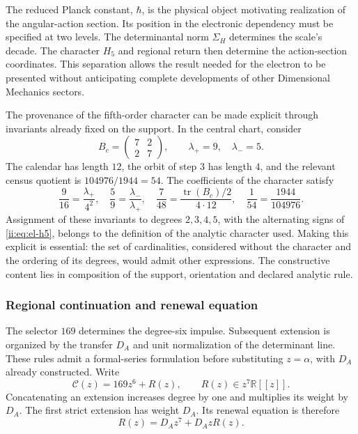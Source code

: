 The reduced Planck constant, \(\hbar\), is the physical object motivating realization of the angular-action section. Its position in the electronic dependency must be specified at two levels. The determinantal norm \(\Sigma_H\) determines the scale's decade. The character \(H_5\) and regional return then determine the action-section coordinates. This separation allows the result needed for the electron to be presented without anticipating complete developments of other Dimensional Mechanics sectors.

The provenance of the fifth-order character can be made explicit through invariants already fixed on the support. In the central chart, consider
\[
 B_c=\begin{pmatrix}7&2\\2&7\end{pmatrix},
 \qquad \lambda_+=9,\quad\lambda_-=5.
\]
The calendar has length \(12\), the orbit of step \(3\) has length \(4\), and the relevant census quotient is \(104976/1944=54\). The coefficients of the character satisfy
\begin{equation}
 \frac9{16}=\frac{\lambda_+}{4^2},\quad
 \frac59=\frac{\lambda_-}{\lambda_+},\quad
 \frac7{48}=\frac{\operatorname{tr}(B_c)/2}{4\cdot12},\quad
 \frac1{54}=\frac{1944}{104976}.
 \label{ii:eq:revision-h5-coeficientes}
\end{equation}
Assignment of these invariants to degrees \(2,3,4,5\), with the alternating signs of \eqref{ii:eq:el-h5}, belongs to the definition of the analytic character used. Making this explicit is essential: the set of cardinalities, considered without the character and the ordering of its degrees, would admit other expressions. The constructive content lies in composition of the support, orientation and declared analytic rule.

\subsubsection{Regional continuation and renewal equation}

The selector \(169\) determines the degree-six impulse. Subsequent extension is organized by the transfer \(D_A\) and unit normalization of the determinant line. These rules admit a formal-series formulation before substituting \(z=\alpha\), with \(D_A\) already constructed. Write
\[
 \mathscr C(z)=169z^6+R(z),\qquad R(z)\in z^7\mathbb R[[z]].
\]
Concatenating an extension increases degree by one and multiplies its weight by \(D_A\). The first strict extension has weight \(D_A\). Its renewal equation is therefore
\begin{equation}
 R(z)=D_Az^7+D_AzR(z).
 \label{ii:eq:revision-renovacion}
\end{equation}

